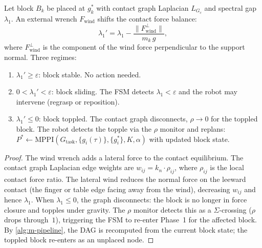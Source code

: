 \begin{proposition}\label{prop:m-wind}
Let block $B_k$ be placed at $g_k^*$ with contact graph Laplacian
$L_{G_c}$ and spectral gap $\lambda_1$.  An external wrench
$F_{\mathrm{wind}}$ shifts the contact force balance:
\[
  \lambda_1'
  = \lambda_1
  - \frac{\|F_{\mathrm{wind}}^{\perp}\|}{m_k\, g},
\]
where $F_{\mathrm{wind}}^{\perp}$ is the component of
the wind force perpendicular to the support normal.
Three regimes:
\begin{enumerate}[label=(\alph*),nosep]
  \item $\lambda_1' \geq \varepsilon$: block stable.
  No action needed.
  \item $0 < \lambda_1' < \varepsilon$: block sliding.
  The FSM detects $\lambda_1 < \varepsilon$ and the robot
  may intervene (regrasp or reposition).
  \item $\lambda_1' \leq 0$: block toppled.  The contact graph
  disconnects, $\rho \to 0$ for the toppled block.  The robot
  detects the topple via the $\rho$ monitor and replans:
  $P^* \gets \mathrm{MPPI}(G_{\mathrm{task}},
  \{g_i(\tau)\}, \{g_i^*\}, K, \alpha)$ with updated block
  state.
\end{enumerate}
\end{proposition}

\begin{proof}
The wind wrench adds a lateral force to the contact equilibrium.
The contact graph Laplacian edge weights are
$w_{ij} = k_n \cdot \rho_{ij}$, where $\rho_{ij}$ is the local
contact force ratio.  The lateral wind reduces the normal force on
the leeward contact (the finger or table edge facing away from the
wind), decreasing $w_{ij}$ and hence $\lambda_1$.  When
$\lambda_1 \leq 0$, the graph disconnects: the block is no longer
in force closure and topples under gravity.  The $\rho$ monitor
detects this as a $\Sigma$-crossing ($\rho$ drops through~$1$),
triggering the FSM to re-enter Phase~1 for the affected block.
By \cref{alg:m-pipeline}, the DAG is recomputed from the current
block state; the toppled block re-enters as an unplaced node.
\end{proof}

